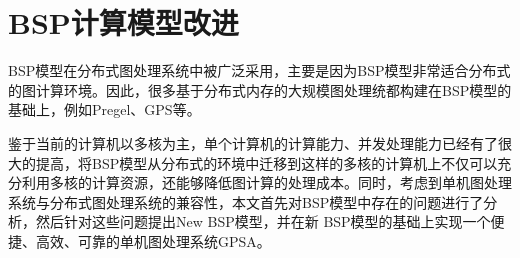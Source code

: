 \section{BSP计算模型改进}

BSP模型在分布式图处理系统中被广泛采用，主要是因为BSP模型非常适合分布式的图计算环境。因此，很多基于分布式内存的大规模图处理统都构建在BSP模型的基础上，例如Pregel、GPS等。

鉴于当前的计算机以多核为主，单个计算机的计算能力、并发处理能力已经有了很大的提高，将BSP模型从分布式的环境中迁移到这样的多核的计算机上不仅可以充分利用多核的计算资源，还能够降低图计算的处理成本。同时，考虑到单机图处理系统与分布式图处理系统的兼容性，本文首先对BSP模型中存在的问题进行了分析，然后针对这些问题提出New BSP模型，并在新 BSP模型的基础上实现一个便捷、高效、可靠的单机图处理系统GPSA。



